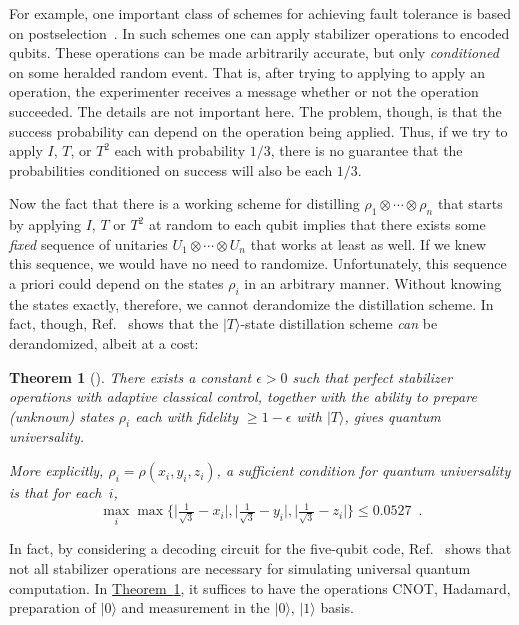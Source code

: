 \documentclass[11pt]{article}
\def\ket #1{\vert #1\rangle}
\def\abs #1{\lvert #1\rvert}
\newcommand{\beq}{\begin{equation}}
\newcommand{\eeq}{\end{equation}}
\newtheorem{theorem}{Theorem}  %
\theoremstyle{note}
\newcommand{\thmref}[1]{\hyperref[#1]{{Theorem~\ref*{#1}}}}
\begin{document}
For example, one important class of schemes for achieving fault tolerance is based on postselection~\cite{Knill05, Reichardt06thesis, AliferisGottesmanPreskill07postselected, Reichardt07algorithmica}.  In such schemes one can apply stabilizer operations to encoded qubits.  These operations can be made arbitrarily accurate, but only \emph{conditioned} on some heralded random event.  That is, after trying to applying to apply an operation, the experimenter receives a message whether or not the operation succeeded.  The details are not important here.  The problem, though, is that the success probability can depend on the operation being applied.  Thus, if we try to apply $I$, $T$, or $T^2$ each with probability $1/3$, there is no guarantee that the probabilities conditioned on success will also be each $1/3$.  

Now the fact that there is a working scheme for distilling $\rho_1 \otimes \cdots \otimes \rho_n$ that starts by applying $I$, $T$ or $T^2$ at random to each qubit implies that there exists some \emph{fixed} sequence of unitaries $U_1 \otimes \cdots \otimes U_n$ that works at least as well.  If we knew this sequence, we would have no need to randomize.  Unfortunately, this sequence a priori could depend on the states $\rho_i$ in an arbitrary manner.  Without knowing the states exactly, therefore, we cannot derandomize the distillation scheme.  In fact, though, Ref.~\cite{Reichardt07algorithmica} shows that the $\ket T$-state distillation scheme \emph{can} be derandomized, albeit at a cost: 

\begin{theorem}[{\cite[Theorem~1]{Reichardt07algorithmica}}] \label{t:practicalmagicdeterministic}
There exists a constant $\epsilon > 0$ such that perfect stabilizer operations with adaptive classical control, together with the ability to prepare (unknown) states $\rho_i$ each with fidelity $\geq 1-\epsilon$ with $\ket T$, gives quantum universality.  

More explicitly, $\rho_i = \rho(x_i, y_i, z_i)$, a sufficient condition for quantum universality is that for each~$i$, 
\beq
\max_i \max \big\{ \abs{\tfrac{1}{\sqrt{3}} - x_i}, \abs{\tfrac{1}{\sqrt{3}} - y_i}, \abs{\tfrac{1}{\sqrt{3}} - z_i} \big\} \leq 0.0527
 \enspace .
\eeq
\end{theorem}

In fact, by considering a decoding circuit for the five-qubit code, Ref.~\cite{Reichardt07algorithmica} shows that not all stabilizer operations are necessary for simulating universal quantum computation.  In \thmref{t:practicalmagicdeterministic}, it suffices to have the operations CNOT, Hadamard, preparation of $\ket 0$ and measurement in the $\ket 0$, $\ket 1$ basis.  
\end{document}
